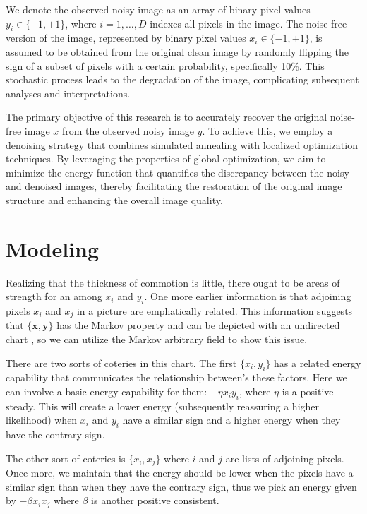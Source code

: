 \documentclass[conference]{IEEEtran}
\begin{document}
We denote the observed noisy image as an array of binary pixel values \(y_i \in \{-1, +1\}\), where \(i = 1, \ldots, D\) indexes all pixels in the image. The noise-free version of the image, represented by binary pixel values \(x_i \in \{-1, +1\}\), is assumed to be obtained from the original clean image by randomly flipping the sign of a subset of pixels with a certain probability, specifically 10\%. This stochastic process leads to the degradation of the image, complicating subsequent analyses and interpretations.

The primary objective of this research is to accurately recover the original noise-free image \(x\) from the observed noisy image \(y\). To achieve this, we employ a denoising strategy that combines simulated annealing with localized optimization techniques. By leveraging the properties of global optimization, we aim to minimize the energy function that quantifies the discrepancy between the noisy and denoised images, thereby facilitating the restoration of the original image structure and enhancing the overall image quality.


\section{Modeling}
\vspace{1em}
Realizing that the thickness of commotion is little, there ought to be areas of strength for an among $x_i$ and $y_i$. One more earlier information is that adjoining pixels $x_i$ and $x_j$ in a picture are emphatically related. This information suggests that $\{\mathbf{x}, \mathbf{y}\}$ has the Markov property and can be depicted with an undirected chart \cite{bishop2006pattern}, so we can utilize the Markov arbitrary field to show this issue.

There are two sorts of coteries in this chart. The first $\{x_i, y_i\}$ has a related energy capability that communicates the relationship between's these factors. Here we can involve a basic energy capability for them: $-\eta x_i y_i$, where $\eta$ is a positive steady. This will create a lower energy (subsequently reassuring a higher likelihood) when $x_i$ and $y_i$ have a similar sign and a higher energy when they have the contrary sign.

The other sort of coteries is $\{x_i, x_j\}$ where $i$ and $j$ are lists of adjoining pixels. Once more, we maintain that the energy should be lower when the pixels have a similar sign than when they have the contrary sign, thus we pick an energy given by $-\beta x_i x_j$ where $\beta$ is another positive consistent.
\end{document}
